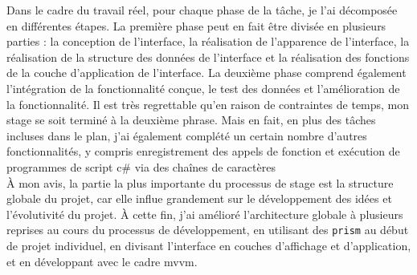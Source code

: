 Dans le cadre du travail réel, pour chaque phase de la tâche, je l'ai décomposée en différentes étapes. La première phase peut en fait être divisée en plusieurs parties : la conception de l'interface, la réalisation de l'apparence de l'interface, la réalisation de la structure des données de l'interface et la réalisation des fonctions de la couche d'application de l'interface. La deuxième phase comprend également l'intégration de la fonctionnalité conçue, le test des données et l'amélioration de la fonctionnalité. Il est très regrettable qu'en raison de contraintes de temps, mon stage se soit terminé à la deuxième phrase. Mais en fait, en plus des tâches incluses dans le plan, j'ai également complété un certain nombre d'autres fonctionnalités, y compris enregistrement des appels de fonction et exécution de programmes de script c\# via des chaînes de caractères\\

À mon avis, la partie la plus importante du processus de stage est la structure globale du projet, car elle influe grandement sur le développement des idées et l'évolutivité du projet. À cette fin, j'ai amélioré l'architecture globale à plusieurs reprises au cours du processus de développement, en utilisant des \texttt{prism} au début de projet individuel, en divisant l'interface en couches d'affichage et d'application, et en développant avec le cadre mvvm.



\newpage
